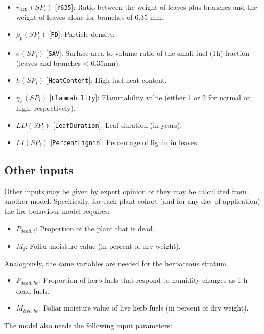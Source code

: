 \documentclass[]{book}
\providecommand{\tightlist}{%
  \setlength{\itemsep}{0pt}\setlength{\parskip}{0pt}}
\begin{document}
\begin{itemize}
\tightlist
\item
  \(r_{6.35}(SP_i)\) {[}\texttt{r635}{]}: Ratio between the weight of leaves plus branches and the weight of leaves alone for branches of 6.35 mm.
\item
  \(\rho_p(SP_i)\) {[}\texttt{PD}{]}: Particle density.
\item
  \(\sigma(SP_i)\) {[}\texttt{SAV}{]}: Surface-area-to-volume ratio of the small fuel (1h) fraction (leaves and branches \textless{} 6.35mm).
\item
  \(h(SP_i)\) {[}\texttt{HeatContent}{]}: High fuel heat content.
\item
  \(\eta_{F}(SP_i)\) {[}\texttt{Flammability}{]}: Flammability value (either 1 or 2 for normal or high, respectively).
\item
  \(LD(SP_i)\) {[}\texttt{LeafDuration}{]}: Leaf duration (in years).
\item
  \(LI(SP_i)\) {[}\texttt{PercentLignin}{]}: Percentage of lignin in leaves.
\end{itemize}

\hypertarget{other-inputs}{%
\subsection{Other inputs}\label{other-inputs}}

Other inputs may be given by expert opinion or they may be calculated from another model. Specifically, for each plant cohort (and for any day of application) the fire behaviour model requires:

\begin{itemize}
\tightlist
\item
  \(P_{dead,i}\): Proportion of the plant that is dead.
\item
  \(M_i\): Foliar moisture value (in percent of dry weight).
\end{itemize}

Analogously, the same variables are needed for the herbaceous stratum.

\begin{itemize}
\tightlist
\item
  \(P_{dead,he}\): Proportion of herb fuels that respond to humidity changes as 1-h dead fuels.
\item
  \(M_{live,he}\): Foliar moisture value of live herb fuels (in percent of dry weight).
\end{itemize}

The model also needs the following input parameters:
\end{document}
